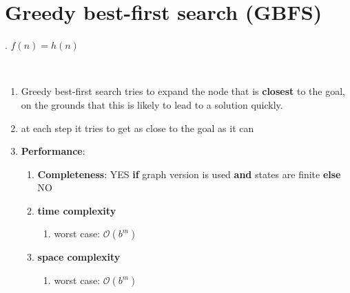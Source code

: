 \section{Greedy best-first search (GBFS) \cite{ai/book/Artificial-Intelligence-A-Modern-Approach/Russell-Norvig}}
\label{AI: Algorithms/Greedy best-first search (GBFS)}

.\hfill
$f(n) = h(n)$
\hfill \cite{ai/book/Artificial-Intelligence-A-Modern-Approach/Russell-Norvig}

\ \\

\begin{enumerate}
    \item Greedy best-first search tries to expand the node that is \textbf{closest} to the goal, on the grounds that this is likely to lead to a solution quickly.
    \hfill \cite{ai/book/Artificial-Intelligence-A-Modern-Approach/Russell-Norvig}

    \item at each step it tries to get as close to the goal as it can
    \hfill \cite{ai/book/Artificial-Intelligence-A-Modern-Approach/Russell-Norvig}

    \item \textbf{Performance}:
    \begin{enumerate}
        \item \textbf{Completeness}: YES \textbf{if} graph version is used \textbf{and} states are finite \textbf{else} NO
        \hfill \cite{ai/book/Artificial-Intelligence-A-Modern-Approach/Russell-Norvig}

        \item \textbf{time complexity}
        \begin{enumerate}
            \item worst case: $\mathcal{O}(b^m)$
            \hfill \cite{ai/book/Artificial-Intelligence-A-Modern-Approach/Russell-Norvig}
        \end{enumerate}

        \item \textbf{space complexity}
        \begin{enumerate}
            \item worst case: $\mathcal{O}(b^m)$
            \hfill \cite{ai/book/Artificial-Intelligence-A-Modern-Approach/Russell-Norvig}
        \end{enumerate}
    \end{enumerate}
\end{enumerate}




